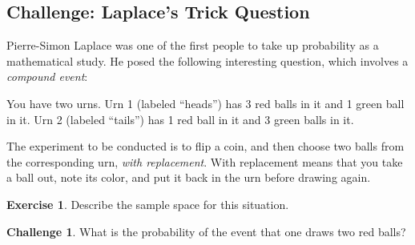 \documentclass[12pt,letterpaper]{article}
\theoremstyle{definition}
\newtheorem{exercise}[question]{Exercise}
\newtheorem*{challenge}{Challenge}
\begin{document}
\subsection*{Challenge: Laplace's Trick Question}

Pierre-Simon Laplace was one of the first people to take up probability as a mathematical study.
He posed the following interesting question, which involves a \emph{compound event}:

You have two urns.
Urn 1 (labeled ``heads'') has 3 red balls in it and 1 green ball in it.
Urn 2 (labeled ``tails'') has 1 red ball in it and 3 green balls in it.

The experiment to be conducted is to flip a coin, and then choose two balls from the corresponding urn, \emph{with replacement}. 
With replacement means that you take a ball out, note its color, and put it back in the urn before drawing again.

\begin{exercise}
Describe the sample space for this situation.
\end{exercise}

\begin{challenge}
What is the probability of the event that one draws two red balls?
\end{challenge}




\end{document}
